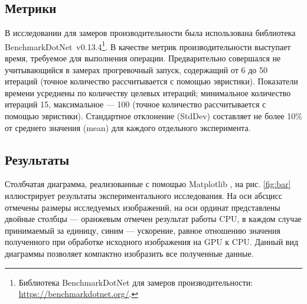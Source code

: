 \begin{table}
\begin{center}
\caption{Параметры изображений}
\label{tbl:images}
\end{center}
\end{table}

\subsection{Метрики}

В исследовании для замеров производительности была использована библиотека Bench\-mark\-Dot\-Net~v0.13.4\footnote{Библиотека BenchmarkDotNet для замеров производительности: \url{https://benchmarkdotnet.org/}.}. В качестве метрик производительности выступает время, требуемое для выполнения операции. Предварительно совершался не учитывающийся в замерах прогревочный запуск, содержащий от 6 до 50 итераций (точное количество рассчитывается с помощью эвристики). Показатели времени усреднены по количеству целевых итераций; минимальное количество итераций 15, максимальное --- 100 (точное количество рассчитывается с помощью эвристики). Стандартное отклонение (StdDev) составляет не более 10\% от среднего значения (mean) для каждого отдельного эксперимента. 

\subsection{Результаты}

Столбчатая диаграмма, реализованные с помощью Mat\-plot\-lib \cite{Hunter:2007}, на рис. \ref{fig:bar} иллюстрирует результаты экспериментального исследования. На оси абсцисс отмечены размеры исследуемых изображений, на оси ординат представлены двойные столбцы --- оранжевым отмечен результат работы CPU, в каждом случае принимаемый за единицу, синим --- ускорение, равное отношению значения полученного при обработке исходного изображения на GPU к CPU. Данный вид диаграммы позволяет компактно изобразить все полученные данные.


